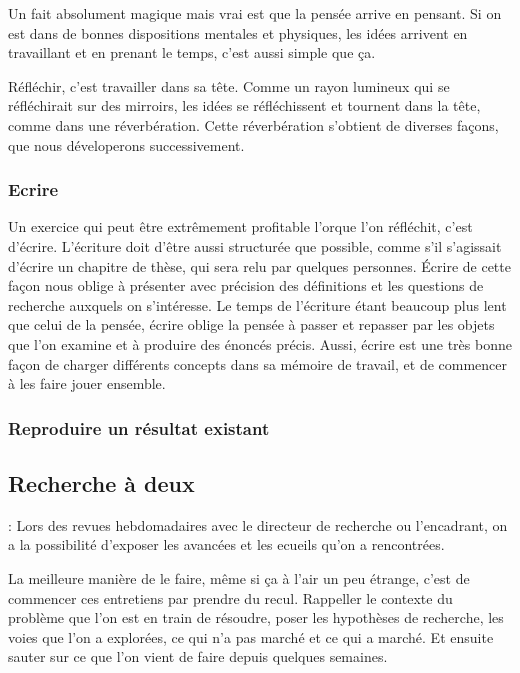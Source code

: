 \documentclass[24pt]{article}
\begin{document}
Un fait absolument magique mais vrai est que la pensée arrive en pensant.  Si on est dans de bonnes dispositions mentales et physiques, les idées arrivent en travaillant et en prenant le temps, c'est aussi simple que ça.

Réfléchir, c'est travailler dans sa tête. 
Comme un rayon lumineux qui se réfléchirait sur des mirroirs, les idées se réfléchissent et tournent dans la tête, comme dans une réverbération. Cette réverbération s'obtient de diverses façons, que nous déveloperons successivement. 

\subsubsection{Ecrire}

    Un exercice qui peut être extrêmement profitable l'orque l'on réfléchit, c'est d'écrire. L'écriture doit d'être aussi  structurée que possible, comme s'il s'agissait d'écrire un chapitre de thèse, qui sera relu par quelques personnes. 
    Écrire de cette façon nous oblige à présenter avec précision des définitions et les questions de recherche auxquels on s'intéresse. Le temps de l'écriture étant beaucoup plus lent que celui de la pensée, écrire oblige la pensée à passer et repasser par les objets que l'on examine et à produire des énoncés précis.  Aussi, écrire est une très bonne façon de charger différents concepts dans sa mémoire de travail, et de commencer  à les faire jouer ensemble.

   
\subsubsection{Reproduire un résultat existant}









\subsection{Recherche à deux}:
Lors des revues hebdomadaires  avec le directeur de recherche ou l'encadrant, on a la possibilité d'exposer les avancées et les ecueils qu'on a rencontrées. 

La meilleure manière de le faire, même si ça à l'air un peu étrange, c'est de commencer ces entretiens par prendre du recul. Rappeller le contexte du problème que l'on est en train de résoudre, poser les hypothèses de recherche, les voies que l'on a explorées, ce qui n'a pas marché et ce qui a marché. Et ensuite sauter sur ce que l'on vient de faire depuis quelques semaines. 
\end{document}
